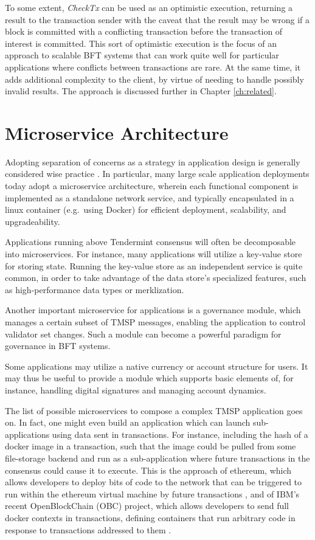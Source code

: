 To some extent, \emph{CheckTx} can be used as an optimistic execution, 
returning a result to the transaction sender with the caveat that 
the result may be wrong if a block is committed with a conflicting transaction
before the transaction of interest is committed.
This sort of optimistic execution is the focus of an approach to scalable BFT systems 
that can work quite well for particular applications where conflicts between transactions are rare. 
At the same time, it adds additional complexity to the client, by virtue of needing to handle possibly invalid results.
The approach is discussed further in Chapter \ref{ch:related}.

\section{Microservice Architecture}

Adopting separation of concerns as a strategy in application design is generally considered wise practice \cite{hursch1995separation}.
In particular, many large scale application deployments today adopt a microservice architecture,
wherein each functional component is implemented as a standalone network service, 
and typically encapsulated in a linux container (e.g.~using Docker) for efficient deployment, scalability, and upgradeability.

Applications running above Tendermint consensus will often be decomposable into microservices.
For instance, many applications will utilize a key-value store for storing state.
Running the key-value store as an independent service is quite common, 
in order to take advantage of the data store's specialized features, such as high-performance data types or merklization.

Another important microservice for applications is a governance module, 
which manages a certain subset of TMSP messages, enabling the application to control validator set changes.
Such a module can become a powerful paradigm for governance in BFT systems.

Some applications may utilize a native currency or account structure for users.
It may thus be useful to provide a module which supports basic elements of, for instance,
handling digital signatures and managing account dynamics.

The list of possible microservices to compose a complex TMSP application goes on. 
In fact, one might even build an application which can launch sub-applications using data sent in transactions.
For instance, including the hash of a docker image in a transaction,
such that the image could be pulled from some file-storage backend and run as a sub-application where
future transactions in the consensus could cause it to execute. 
This is the approach of ethereum, 
which allows developers to deploy bits of code to the network that can be triggered to run within the ethereum virtual machine by future transactions \cite{ethereum},
and of IBM's recent OpenBlockChain (OBC) project, which allows developers to send full docker contexts in transactions, 
defining containers that run arbitrary code in response to transactions addressed to them \cite{obc}.

